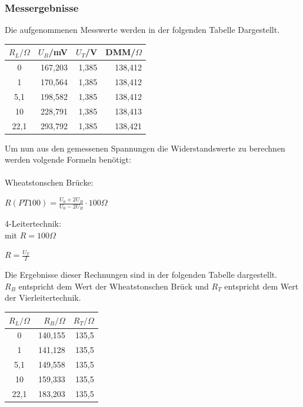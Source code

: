 \documentclass[a4paper,11pt,oneside]{article}
\begin{document}
\subsubsection{Messergebnisse}
Die aufgenommenen Messwerte werden in der folgenden Tabelle Dargestellt.\\
\begin{center}
\begin{tabular}{|c|r|r|r|}
\hline 
$R_L/\Omega $ & $U_{B}$/mV & $U_{T}$/V & DMM/$\Omega$ \\ 
\hline 
0 & 167,203 & 1,385 & 138,412 \\ 
\hline 
1 & 170,564 & 1,385 & 138,412 \\ 
\hline 
5,1 & 198,582 & 1,385 & 138,412 \\ 
\hline 
10 & 228,791 & 1,385 & 138,413 \\ 
\hline 
22,1 & 293,792 & 1,385 & 138,421 \\ 
\hline 
\end{tabular} 
\end{center}
\vspace{1cm}
Um nun aus den gemessenen Spannungen die Widerstandswerte zu berechnen werden volgende Formeln benötigt:\\\\
Wheatstonschen Brücke:\\
\begin{center}
$R(PT100)= \frac{U_0+2U_B}{U_0-2U_B}\cdot 100\Omega$

\end{center}
4-Leitertechnik:\\
mit $R=100\Omega$\\
\begin{center}
$R=\frac{U_T}{I}$
\end{center}
Die Ergebnisse dieser Rechnungen sind in der folgenden Tabelle dargestellt.\\
$R_B$ entspricht dem Wert der Wheatstonschen Brück und $R_T$ entspricht dem Wert der Vierleitertechnik.
\begin{center}
\begin{tabular}{|c|r|r|}
\hline 
$R_L/\Omega$ & $R_B/\Omega$ & $R_T/\Omega$ \\ 
\hline 
0 & 140,155 & 135,5 \\ 
\hline 
1 & 141,128 & 135,5 \\ 
\hline 
5,1 & 149,558 & 135,5 \\ 
\hline 
10 & 159,333 & 135,5 \\ 
\hline 
22,1 & 183,203 & 135,5 \\ 
\hline 
\end{tabular} 
\end{center}
\end{document}
